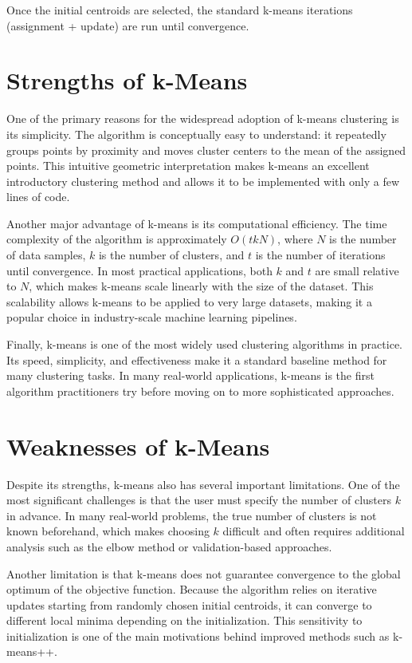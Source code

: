 \documentclass{article}
\begin{document}
Once the initial centroids are selected, the standard k-means iterations
(assignment + update) are run until convergence.


\section{Strengths of k-Means}

One of the primary reasons for the widespread adoption of k-means clustering is
its simplicity. The algorithm is conceptually easy to understand: it repeatedly
groups points by proximity and moves cluster centers to the mean of the assigned
points. This intuitive geometric interpretation makes k-means an excellent
introductory clustering method and allows it to be implemented with only a few
lines of code.

Another major advantage of k-means is its computational efficiency. The time
complexity of the algorithm is approximately $O(tkN)$, where $N$ is the number of
data samples, $k$ is the number of clusters, and $t$ is the number of iterations
until convergence. In most practical applications, both $k$ and $t$ are small
relative to $N$, which makes k-means scale linearly with the size of the dataset.
This scalability allows k-means to be applied to very large datasets, making it a
popular choice in industry-scale machine learning pipelines.

Finally, k-means is one of the most widely used clustering algorithms in
practice. Its speed, simplicity, and effectiveness make it a standard baseline
method for many clustering tasks. In many real-world applications, k-means is the
first algorithm practitioners try before moving on to more sophisticated
approaches.

\section{Weaknesses of k-Means}

Despite its strengths, k-means also has several important limitations. One of the
most significant challenges is that the user must specify the number of clusters
$k$ in advance. In many real-world problems, the true number of clusters is not
known beforehand, which makes choosing $k$ difficult and often requires
additional analysis such as the elbow method or validation-based approaches.

Another limitation is that k-means does not guarantee convergence to the global
optimum of the objective function. Because the algorithm relies on iterative
updates starting from randomly chosen initial centroids, it can converge to
different local minima depending on the initialization. This sensitivity to
initialization is one of the main motivations behind improved methods such as
k-means++.
\end{document}
